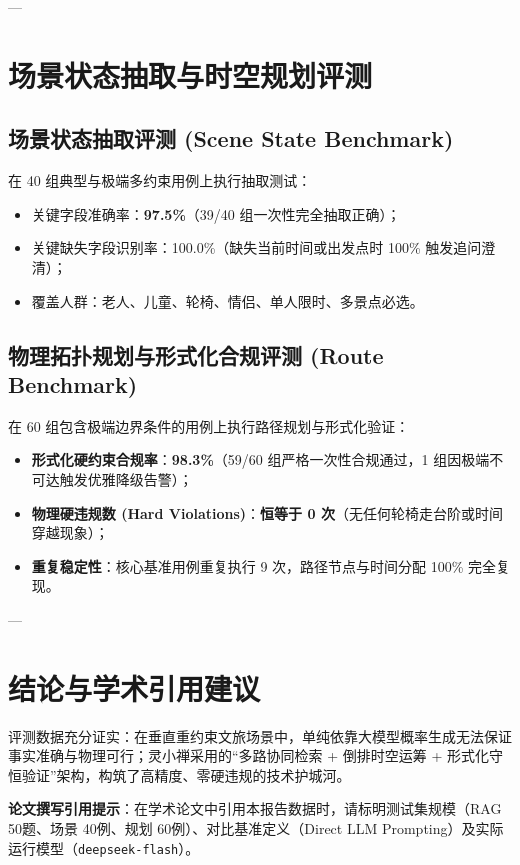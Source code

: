 \documentclass[11pt,a4paper]{ctexart}
\begin{document}
---

\section{场景状态抽取与时空规划评测}

\subsection{场景状态抽取评测 (Scene State Benchmark)}
在 40 组典型与极端多约束用例上执行抽取测试：
\begin{itemize}
    \item 关键字段准确率：\textbf{97.5\%}（39/40 组一次性完全抽取正确）；
    \item 关键缺失字段识别率：100.0\%（缺失当前时间或出发点时 100\% 触发追问澄清）；
    \item 覆盖人群：老人、儿童、轮椅、情侣、单人限时、多景点必选。
\end{itemize}

\subsection{物理拓扑规划与形式化合规评测 (Route Benchmark)}
在 60 组包含极端边界条件的用例上执行路径规划与形式化验证：
\begin{itemize}
    \item \textbf{形式化硬约束合规率}：\textbf{98.3\%}（59/60 组严格一次性合规通过，1 组因极端不可达触发优雅降级告警）；
    \item \textbf{物理硬违规数 (Hard Violations)}：\textbf{恒等于 0 次}（无任何轮椅走台阶或时间穿越现象）；
    \item \textbf{重复稳定性}：核心基准用例重复执行 9 次，路径节点与时间分配 100\% 完全复现。
\end{itemize}

---

\section{结论与学术引用建议}

评测数据充分证实：在垂直重约束文旅场景中，单纯依靠大模型概率生成无法保证事实准确与物理可行；灵小禅采用的“多路协同检索 + 倒排时空运筹 + 形式化守恒验证”架构，构筑了高精度、零硬违规的技术护城河。

\textbf{论文撰写引用提示}：在学术论文中引用本报告数据时，请标明测试集规模（RAG 50题、场景 40例、规划 60例）、对比基准定义（Direct LLM Prompting）及实际运行模型（\texttt{deepseek-flash}）。
\end{document}
